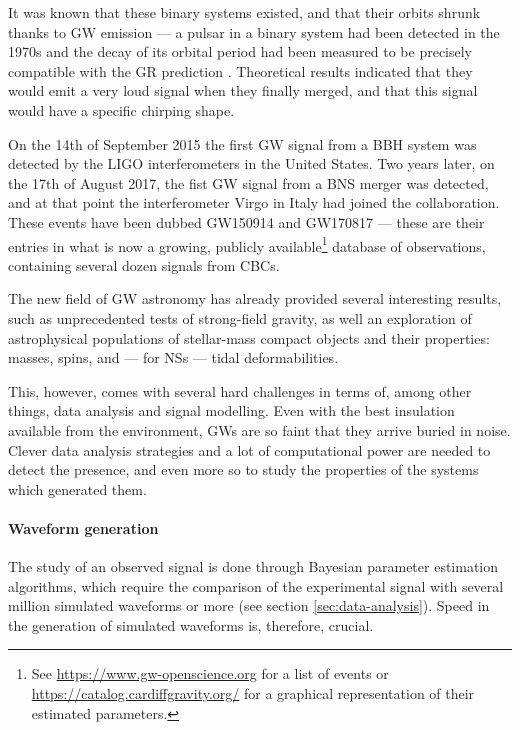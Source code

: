 \documentclass[main.tex]{subfiles}
\begin{document}
It was known that these binary systems existed, and that their orbits shrunk thanks to \ac{GW} emission --- a pulsar in a binary system had been detected in the 1970s and the decay of its orbital period had been measured to be precisely compatible with the \ac{GR} prediction \cites{hulseDiscoveryPulsarBinary1975}{taylorNewTestGeneral1982}.
Theoretical results indicated that they would emit a very loud signal when they finally merged, and that this signal would have a specific chirping shape. 

On the 14th of September 2015 the first \ac{GW} signal from a \ac{BBH} system was detected \cite[]{ligoscientificcollaborationandvirgocollaborationObservationGravitationalWaves2016} by the \ac{LIGO} interferometers in the United States. 
Two years later, on the 17th of August 2017, the fist \ac{GW} signal from a \ac{BNS} merger \cite{abbottGW170817ObservationGravitational2017}
was detected, and at that point the interferometer Virgo in Italy had joined the collaboration.
These events have been dubbed GW150914 and GW170817 --- these are their entries in what is now a growing, publicly available\footnote{See \url{https://www.gw-openscience.org} for a list of events or \url{https://catalog.cardiffgravity.org/} for a graphical representation of their estimated parameters.} database of observations, containing several dozen signals from \acp{CBC}.

The new field of \ac{GW} astronomy has already provided several interesting results, such as unprecedented tests of strong-field gravity, as well an exploration of astrophysical populations of stellar-mass compact objects and their properties: masses, spins, and --- for \acp{NS} --- tidal deformabilities. 

This, however, comes with several hard challenges in terms of, among other things, data analysis and signal modelling.
Even with the best insulation available from the environment, \acp{GW} are so faint that they arrive buried in noise. 
Clever data analysis strategies and a lot of computational power are needed to detect the presence, and even more so to study the properties of the systems which generated them.

\paragraph{Waveform generation}

The study of an observed signal is done through Bayesian parameter estimation algorithms, which require the comparison of the experimental signal with several million \cite{lackeyEffectiveonebodyWaveformsBinary2017} simulated waveforms or more (see section \ref{sec:data-analysis}).
Speed in the generation of simulated waveforms is, therefore, crucial.
\end{document}
